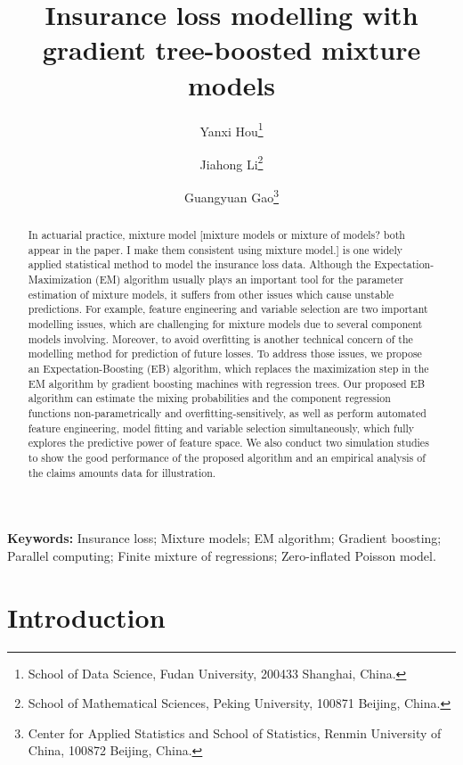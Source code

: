 \documentclass[11pt]{article}
\title{Insurance loss modelling with gradient tree-boosted mixture models}
\author{ Yanxi Hou\footnote{School of Data Science, Fudan University, 200433 Shanghai, China.} \and Jiahong Li\footnote{School of Mathematical Sciences, Peking University, 100871 Beijing, China.} \and Guangyuan Gao\footnote{Center for Applied Statistics and School of Statistics, Renmin University of China, 100872 Beijing, China.}}
\numberwithin{equation}{section}
\begin{document}
\maketitle

\begin{abstract}

In actuarial practice, mixture model {\color{blue}[mixture models or mixture of models? both appear in the paper. I make them consistent using mixture model.]} is one widely applied statistical method to model the insurance loss data. 
Although the Expectation-Maximization (EM) algorithm usually plays an important tool for the parameter estimation of mixture  models, it suffers from other issues which cause unstable predictions. 
For example, feature engineering and variable selection are two important modelling issues, which are challenging for mixture models due to several component models involving. 
Moreover, to avoid overfitting is another technical concern of the modelling method for prediction of future losses. 
To address those issues, we propose an Expectation-Boosting (EB) algorithm, 
which replaces the maximization step in the EM algorithm by gradient boosting machines with regression trees. 
Our proposed EB algorithm can estimate the mixing probabilities and the component regression functions non-parametrically and overfitting-sensitively, as well as
perform automated feature engineering, model fitting and variable selection simultaneously, which
fully explores the predictive power of feature space.
We also conduct two simulation studies to show the good performance of the proposed algorithm and an empirical analysis of the claims amounts data for illustration. 

\end{abstract}

{\bf Keywords:} Insurance loss; Mixture models; EM algorithm; Gradient boosting; Parallel computing; Finite mixture of regressions; Zero-inflated Poisson model. 

\newpage
\section{Introduction}
\end{document}
